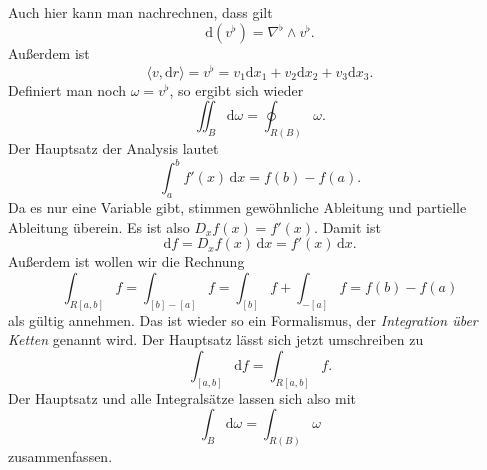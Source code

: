 \documentclass[a4paper,10pt,fleqn,twocolumn,twoside]{article}
\numberwithin{equation}{section}
\begin{document}
Auch hier kann man nachrechnen, dass gilt
\begin{equation}
\mathrm d(v^\flat) = \nabla^\flat\wedge v^\flat.
\end{equation}
Außerdem ist
\begin{equation}
\langle v,\mathrm dr\rangle = v^\flat
= v_1\mathrm dx_1+v_2\mathrm dx_2+v_3\mathrm dx_3.
\end{equation}
Definiert man noch $\omega = v^\flat$, so ergibt sich wieder
\begin{equation}
\iint_B \mathrm d\omega = \oint_{R(B)}\omega.
\end{equation}
%
Der Hauptsatz der Analysis lautet
\begin{equation}
\int_a^b f'(x)\,\mathrm dx = f(b)-f(a).
\end{equation}
Da es nur eine Variable gibt, stimmen gewöhnliche Ableitung und
partielle Ableitung überein. Es ist also $D_x f(x) = f'(x)$.
%
Damit ist
\begin{equation}
\mathrm df = D_x f(x)\,\mathrm dx = f'(x)\,\mathrm dx.
\end{equation}
%
Außerdem ist wollen wir die Rechnung
\begin{equation}
\int_{R[a,b]} f = \int_{[b]-[a]}f = \int_{[b]} f + \int_{-[a]} f
= f(b)-f(a)
\end{equation}
als gültig annehmen. Das ist wieder so ein Formalismus, der
\textit{Integration über Ketten} genannt wird.
%
Der Hauptsatz lässt sich jetzt umschreiben zu
\begin{equation}
\int_{[a,b]} \mathrm df = \int_{R[a,b]}f.
\end{equation}
Der Hauptsatz und alle Integralsätze lassen sich also mit
\begin{equation}
\int_B \mathrm d\omega = \int_{R(B)}\omega
\end{equation}
zusammenfassen.
\end{document}
